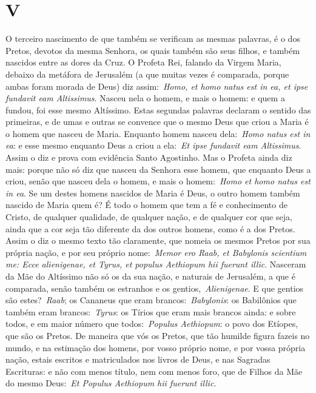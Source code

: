 \section{V}

O terceiro nascimento de que também se verificam as mesmas
palavras, é o dos Pretos, devotos da mesma Senhora, os quais também são
seus filhos, e também nascidos entre as dores da Cruz. O Profeta Rei,
falando da Virgem Maria, debaixo da metáfora de Jerusalém (a que muitas
vezes é comparada, porque ambas foram morada de Deus) diz
assim:~\emph{Homo, et homo natus est in ea, et ipse fundavit eam
Altissimus}. Nasceu nela o homem, e mais o homem: e
quem a fundou, foi esse mesmo Altíssimo. Estas segundas palavras
declaram o sentido das primeiras, e de umas e outras se convence que o
mesmo Deus que criou a Maria é o homem que nasceu de Maria. Enquanto
homem nasceu dela:~\emph{Homo natus est in ea}: e esse mesmo enquanto
Deus a criou a ela:~\emph{Et ipse fundavit eam Altissimus}. Assim o diz
e prova com evidência Santo Agostinho. Mas o Profeta ainda diz mais:
porque não só diz que nasceu da Senhora esse homem, que enquanto Deus a
criou, senão que nasceu dela o homem, e mais o homem:~\emph{Homo et homo
natus est in ea}. Se um destes homens nascidos de Maria é Deus, o outro
homem também nascido de Maria quem é? É todo o homem que tem a fé e
conhecimento de Cristo, de qualquer qualidade, de qualquer nação, e de
qualquer cor que seja, ainda que a cor seja tão diferente da dos outros
homens, como é a dos Pretos. Assim o diz o mesmo texto tão claramente,
que nomeia os mesmos Pretos por sua própria nação, e por seu próprio
nome:~\emph{Memor ero Raab, et Babylonis scientium me: Ecce alienigenae,
et Tyrus, et populus Aethiopum hii fuerunt illic}.
Nasceram da Mãe do Altíssimo não só os da sua nação, e naturais de
Jerusalém, a que é comparada, senão também os estranhos e os
gentios,~\emph{Alienigenae}. E que gentios são estes?~\emph{Raab}; os
Cananeus que eram brancos:~\emph{Babylonis}: os Babilônios que também
eram brancos:~\emph{Tyrus}: os Tírios que eram mais brancos ainda: e
sobre todos, e em maior número que todos:~\emph{Populus Aethiopum}: o
povo dos Etíopes, que são os Pretos. De maneira que vós os Pretos, que
tão humilde figura fazeis no mundo, e na estimação dos homens, por vosso
próprio nome, e por vossa própria nação, estais escritos e matriculados
nos livros de Deus, e nas Sagradas Escrituras: e não com menos título,
nem com menos foro, que de Filhos da Mãe do mesmo Deus:~\emph{Et Populus
Aethiopum hii fuerunt illic}.


